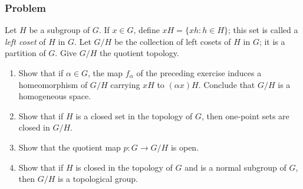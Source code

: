 \subsubsection{Problem}
Let $H$ be a subgroup of $G$. If $x \in G$, define $xH = \{xh : h \in H\}$; this set is called a \emph{left coset} of $H$ in $G$. Let $G/H$ be the collection of left cosets of $H$ in $G$; it is a partition of $G$. Give $G/H$ the quotient topology.
\begin{enumerate}
\item Show that if $\alpha \in G$, the map $f_\alpha$ of the preceding exercise induces a homeomorphism of $G/H$ carrying $xH$ to $(\alpha x)H$. Conclude that $G/H$ is a homogeneous space.
\item Show that if $H$ is a closed set in the topology of $G$, then one-point sets are closed in $G/H$.
\item Show that the quotient map $p : G \to G/H$ is open.
\item Show that if $H$ is closed in the topology of $G$ and is a normal subgroup of $G$, then $G/H$ is a topological group.
\end{enumerate}

